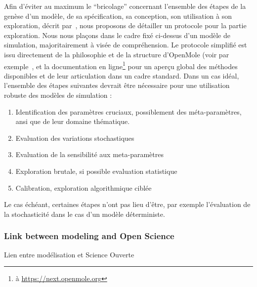 Afin d'éviter au maximum le ``bricolage'' concernant l'ensemble des étapes de la genèse d'un modèle, de sa spécification, sa conception, son utilisation à son exploration, décrit par~\cite{bonhomme2017dictionnaire}, nous proposons de détailler un protocole pour la partie exploration. Nous nous plaçons dans le cadre fixé ci-dessus d'un modèle de simulation, majoritairement à visée de compréhension. Le protocole simplifié est issu directement de la philosophie et de la structure d'OpenMole (voir par exemple~\cite{reuillon2013openmole}, et la documentation en ligne\footnote{à \url{https://next.openmole.org}} pour un aperçu global des méthodes disponibles et de leur articulation dans un cadre standard. Dans un cas idéal, l'ensemble des étapes suivantes devrait être nécessaire pour une utilisation robuste des modèles de simulation :

\begin{enumerate}
	\item Identification des paramètres cruciaux, possiblement des méta-paramètres, ansi que de leur domaine thématique.
	\item Evaluation des variations stochastiques
	\item Evaluation de la sensibilité aux meta-paramètres
	\item Exploration brutale, si possible evaluation statistique
	\item Calibration, exploration algorithmique ciblée
\end{enumerate}

Le cas échéant, certaines étapes n'ont pas lieu d'être, par exemple l'évaluation de la stochasticité dans le cas d'un modèle déterministe.




\subsubsection{Link between modeling and Open Science}{Lien entre modélisation et Science Ouverte}





